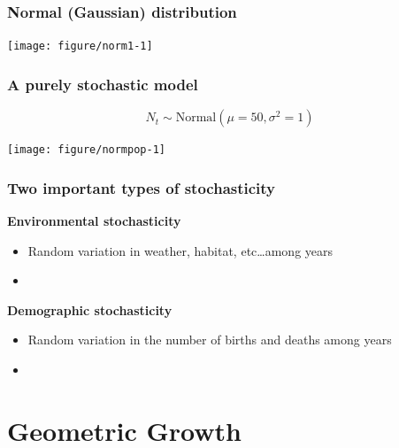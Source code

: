 \documentclass[color=usenames,dvipsnames]{beamer}\usepackage[]{graphicx}\usepackage[]{color}
\begin{document}
\begin{frame}[fragile]
  \frametitle{Normal (Gaussian) distribution}
  \vspace{-0.7cm}
  \begin{center}

  \end{center}
\texttt{[image: figure/norm1-1]}
\end{frame}





\begin{frame}[fragile]
  \frametitle{A purely stochastic model}
  \vspace{-3mm}
  \[
    N_t \sim \mbox{Normal}(\mu=50, \sigma^2=1)
  \]
  \vspace{-8mm}

\begin{center}
  \texttt{[image: figure/normpop-1]}
\end{center}
\end{frame}



\begin{frame}
  \frametitle{Two important types of stochasticity}
  {\bf Environmental stochasticity}
  \begin{itemize}
    \item Random variation in weather, habitat, etc\dots among years
    \item[]
  \end{itemize}
  \pause
  {\bf Demographic stochasticity}
  \begin{itemize}
    \item Random variation in the number of births and deaths among years
    \item[]
  \end{itemize}
\end{frame}







\section{Geometric Growth}
\end{document}
